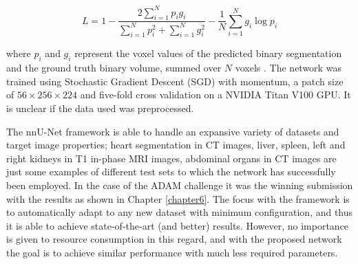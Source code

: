 \[L = 1 - \frac{2\sum_{i=1}^{N}p_{i}g_{i}}{\sum_{i=1}^{N}p_{i}^{2} + \sum_{i=1}^{N}g_{i}^{2}} - \frac{1}{N}\sum_{i=1}^{N}g_{i}\log p_{i}\]

where $p_{i}$ and $g_{i}$ represent the voxel values of the predicted binary segmentation and the ground truth binary volume, summed over $N$ voxels \cite{milletari2016v}. The network was trained using Stochastic Gradient Descent (SGD) with momentum, a patch size of $56 \times 256 \times 224$ and five-fold cross validation on a NVIDIA Titan V100 GPU. It is unclear if the data used was preprocessed. 

The nnU-Net framework is able to handle an expansive variety of datasets and target image properties; heart segmentation in CT images, liver, spleen, left and right kidneys in T1 in-phase MRI images, abdominal organs in CT images are just some examples of different test sets to which the network has successfully been employed. In the case of the ADAM challenge it was the winning submission with the results as shown in Chapter \ref{chapter6}. The focus with the framework is to automatically adapt to any new dataset with minimum configuration, and thus it is able to achieve state-of-the-art (and better) results. However, no importance is given to resource consumption in this regard, and with the proposed network the goal is to achieve similar performance with much less required parameters.


